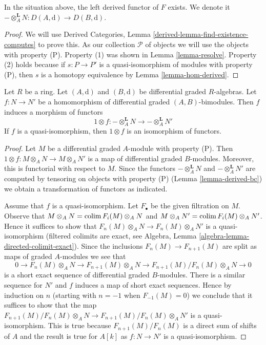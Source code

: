 \begin{lemma}
\label{lemma-derived-bc}
In the situation above, the left derived functor of $F$ exists.
We denote it
$- \otimes_A^\mathbf{L} N : D(A, \text{d}) \to D(B, \text{d})$.
\end{lemma}

\begin{proof}
We will use
Derived Categories, Lemma \ref{derived-lemma-find-existence-computes}
to prove this. As our collection $\mathcal{P}$
of objects we will use the objects with property (P).
Property (1) was shown in Lemma \ref{lemma-resolve}.
Property (2) holds because if $s : P \to P'$ is a quasi-isomorphism
of modules with property (P), then $s$ is a homotopy equivalence
by Lemma \ref{lemma-hom-derived}.
\end{proof}

\begin{lemma}
\label{lemma-functoriality-bc}
Let $R$ be a ring. Let $(A, \text{d})$ and $(B, \text{d})$ be
differential graded $R$-algebras. Let $f : N \to N'$ be a
homomorphism of differential graded $(A, B)$-bimodules.
Then $f$ induces a morphism of functors
$$
1\otimes f :
- \otimes_A^\mathbf{L} N
\longrightarrow
- \otimes_A^\mathbf{L} N'
$$
If $f$ is a quasi-isomorphism, then $1 \otimes f$ is an isomorphism of
functors.
\end{lemma}

\begin{proof}
Let $M$ be a differential graded $A$-module with property (P).
Then $1 \otimes f : M \otimes_A N \to M \otimes_A N'$ is a
map of differential graded $B$-modules. Moreover, this is functorial
with respect to $M$. Since the functors
$- \otimes_A^\mathbf{L} N$ and $- \otimes_A^\mathbf{L} N'$ are
computed by tensoring on objects with property (P)
(Lemma \ref{lemma-derived-bc}) we obtain a transformation of functors
as indicated.

\medskip\noindent
Assume that $f$ is a quasi-isomorphism. Let $F_\bullet$ be the
given filtration on $M$. Observe that
$M \otimes_A N = \mathop{\mathrm{colim}}\nolimits F_i(M) \otimes_A N$ and
$M \otimes_A N' = \mathop{\mathrm{colim}}\nolimits F_i(M) \otimes_A N'$.
Hence it suffices to show that
$F_n(M) \otimes_A N \to F_n(M) \otimes_A N'$
is a quasi-isomorphism (filtered colimits are exact, see
Algebra, Lemma \ref{algebra-lemma-directed-colimit-exact}).
Since the inclusions $F_n(M) \to F_{n + 1}(M)$
are split as maps of graded $A$-modules we see that
$$
0 \to F_n(M) \otimes_A N \to F_{n + 1}(M) \otimes_A N \to
F_{n + 1}(M)/F_n(M) \otimes_A N \to 0
$$
is a short exact sequence of differential graded $B$-modules.
There is a similar sequence for $N'$ and $f$ induces a map
of short exact sequences. Hence by induction on $n$ (starting with $n = -1$
when $F_{-1}(M) = 0$) we conclude that it suffices to show that
the map $F_{n + 1}(M)/F_n(M) \otimes_A N \to F_{n + 1}(M)/F_n(M) \otimes_A N'$
is a quasi-isomorphism. This is true because $F_{n + 1}(M)/F_n(M)$
is a direct sum of shifts of $A$ and the result is true for $A[k]$
as $f : N \to N'$ is a quasi-isomorphism.
\end{proof}

